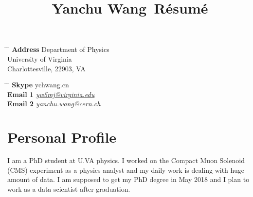 \documentclass[10pt]{article} %
\begin{document}

\title{Yanchu Wang\, \small{Résumé}} %


\parbox{0.5\textwidth}{ %
\begin{tabbing} %
\hspace{3cm} \= \hspace{4cm} \= \kill %
{\bf Address} \> Department of Physics \\
\> University of Virginia\\ %
\> Charlottesville, 22903, VA \\ %

\end{tabbing}}
\hfill %
\parbox{0.5\textwidth}{ %
\begin{tabbing} %
\hspace{3cm} \= \hspace{4cm} \= \kill %
{\bf Skype} \> ychwang.cn \\ %
{\bf Email 1} \> \href{mailto:yw5mj@virginia.edu}{\textit{yw5mj@virginia.edu}} \\ %
{\bf Email 2} \> \href{mailto:yanchu.wang@cern.ch}{\textit{yanchu.wang@cern.ch}} \\ %
\end{tabbing}}


\section{Personal Profile}

I am a PhD student at U.VA physics. I worked on the Compact Muon Solenoid (CMS) experiment as a physics analyst and my daily work is dealing with huge amount of data. I am supposed to get my PhD degree in May 2018 and I plan to work as a data scientist after graduation.
\end{document}
